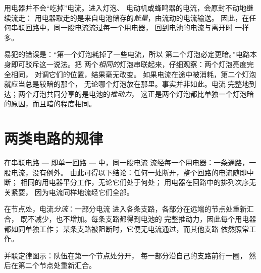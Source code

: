 \begin{proposition}[电流不会被消耗]\label{prop:g7:circuits-series-parallel:notconsumed}
用电器并不会“吃掉”电流。进入灯泡、
电动机或蜂鸣器的电流，会原封不动地继续流走：
用电器取走的是来自电池储存的\emph{能量}，由流动的电流输送。
因此，在任何串联回路中，同一股电流流过每一个用电器，
回到电池的电流与离开时
一样多。
\end{proposition}

\begin{example}[对错误观念的检验]\label{ex:g7:circuits-series-parallel:trial}
易犯的错误是：“第一个灯泡耗掉了一些电流，所以
第二个灯泡必定更暗。”电路本身即可驳斥这一说法。把
两个\emph{相同的}灯泡串联起来，仔细观察：两个灯泡亮度完全相同，
对调它们的位置，结果毫无改变。
如果电流在途中被消耗，第二个灯泡就应当总是较暗的那个，
无论哪个灯泡放在那里。事实并非如此。电流
完整地到达；两个灯泡共同分享的是电池的\emph{推动力}，
这正是两个灯泡都比单独一个灯泡暗的原因，而且暗的程度相同。
\end{example}

\section{两类电路的规律}

\begin{proposition}[串联规律]\label{prop:g7:circuits-series-parallel:series}
在串联电路 --- 即单一回路 --- 中，同一股电流
流经每一个用电器：一条通路，一股电流，没有例外。
由此可得以下结论：任何一处断开，整个回路的电流随即中断；
相同的用电器平分工作，无论它们处于何处；
用电器在回路中的排列次序无关紧要，
因为电流同样地流经它们全部。
\end{proposition}

\begin{proposition}[并联规律]\label{prop:g7:circuits-series-parallel:parallel}
在节点处，电流\emph{分流}：一部分电流
进入各条支路，各部分在远端的节点处重新汇合，
既不减少，也不增加。每条支路都得到电池的
完整推动力，因此每个用电器都如同单独工作；
某条支路被阻断时，它便无电流通过，而其他支路
依然照常工作。
\end{proposition}

\begin{omfigure}

{\small 并联定律图示：队伍在第一个节点处分开，
每一部分沿自己的支路前行一圈，
然后在第二个节点处重新汇合。}
\end{omfigure}

